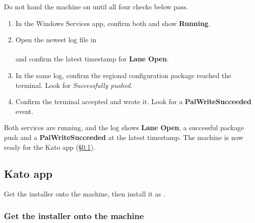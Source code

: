 \documentclass[a4paper,10pt]{article}
\begin{document}
Do not hand the machine on until all four checks below pass.

\begin{enumerate}
  \item In the Windows Services app, confirm both
         and 
        show \textbf{Running}.

  \item Open the newest log file in\\
        \\
        and confirm the latest timestamp for \textbf{Lane Open}.

  \item In the same log, confirm the regional configuration package
        reached the terminal. Look for \emph{Successfully pushed}.
\end{enumerate}


\begin{enumerate}\setcounter{enumi}{3}
  \item Confirm the terminal accepted and wrote it. Look for a
        \textbf{PalWriteSucceeded} event.
\end{enumerate}


\begin{wkinfo}
Both services are running, and the log shows \textbf{Lane Open}, a
successful package push and a \textbf{PalWriteSucceeded} at the latest
timestamp. The machine is now ready for the Kato app (\S\ref{sec:app}).
\end{wkinfo}

\subsection{Kato app}\label{sec:app}

Get the installer onto the machine, then install it as .

\subsubsection{Get the installer onto the machine}\label{sec:getinstaller}
\end{document}
